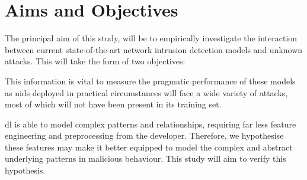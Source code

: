 \chapter{Aims and Objectives}%
\label{chp:aims}
\hypertarget{obj}{}

The principal aim of this study, will be to empirically investigate the
interaction between current state-of-the-art network intrusion detection models
and unknown attacks. This will take the form of two objectives:

\begin{center}
\end{center}

This information is vital to measure the pragmatic performance of these models
as \gls{nids} deployed in practical circumstances will face a wide variety of
attacks, most of which will not have been present in its training set.

\begin{center}
\end{center}

\gls{dl} is able to model complex patterns and relationships,
requiring far less feature engineering and preprocessing from the developer.
Therefore, we hypothesise these features may make it better equipped to model
the complex and abstract underlying patterns in malicious behaviour. This study
will aim to verify this hypothesis.
